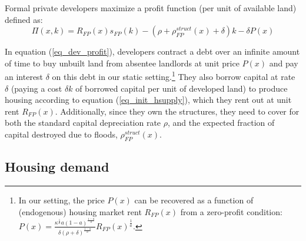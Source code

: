 \documentclass[12pt]{article}
\begin{document}
Formal private developers maximize a profit function (per unit of available land) defined as:
\begin{equation}
\label{eq_dev_profit}
    \Pi(x,k) = R_{FP}(x)s_{FP}(k) - \left(\rho + \rho_{FP}^{struct}(x) + \delta \right)k - \delta P(x)
\end{equation}

In equation (\ref{eq_dev_profit}), developers contract a debt over an infinite amount of time to buy unbuilt land from absentee landlords at unit price $P(x)$ and pay an interest $\delta$ on this debt in our static setting.\footnote{In our setting, the price $P(x)$ can be recovered as a function of (endogenous) housing market rent $R_{FP}(x)$ from a zero-profit condition: $P(x) = \frac{\kappa^\frac{1}{a}a(1-a)^\frac{1-a}{a}}{\delta(\rho+\delta)^\frac{1-a}{a}} R_{FP}(x)^\frac{1}{a}$.} They also borrow capital at rate $\delta$ (paying a cost $\delta k$ of borrowed capital per unit of developed land) to produce housing according to equation (\ref{eq_init_hsupply}), which they rent out at unit rent $R_{FP}(x)$. Additionally, since they own the structures, they need to cover for both the standard capital depreciation rate $\rho$, and the expected fraction of capital destroyed due to floods, $\rho_{FP}^{struct}(x)$.



\subsection{Housing demand \label{sec:eq_dwelling_size}} 
\end{document}
